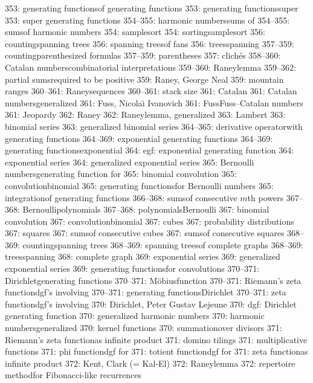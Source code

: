 353: generating functions\sub of generating functions
353: generating functions\sub super
353: super generating functions
354--355: harmonic numbers\sub sums of
354--355: sums\sub of harmonic numbers
354: samplesort
354: sorting\sub samplesort
356: counting\sub spanning trees
356: spanning trees\sub of fans
356: trees\sub spanning
357--359: counting\sub parenthesized formulas
357--359: parentheses
357: clich\'es
358--360: Catalan numbers\sub combinatorial interpretations
359--360: Raney\sub lemma
359--362: partial sums\sub required to be positive
359: Raney, George Neal
359: mountain ranges
360--361: Raney\sub sequences
360--361: stack size
361: Catalan
361: Catalan numbers\sub generalized
361: Fuss, Nicola{\u\i} Ivanovich
361: Fuss\sub Fuss--Catalan numbers
361: Jeopardy
362: Raney
362: Raney\sub lemma, generalized
363: Lambert
363: binomial series
363: generalized binomial series
364--365: derivative operator\sub with generating functions
364--369: exponential generating functions
364--369: generating functions\sub exponential
364: egf: exponential generating function
364: exponential series
364: generalized exponential series
365: Bernoulli numbers\sub generating function for
365: binomial convolution
365: convolution\sub binomial
365: generating functions\sub for Bernoulli numbers
365: integration\sub of generating functions
366--368: sums\sub of consecutive $m$th powers
367--368: Bernoulli\sub polynomials
367--368: polynomials\sub Bernoulli
367: binomial convolution
367: convolution\sub binomial
367: cubes
367: probability distributions
367: squares
367: sums\sub of consecutive cubes
367: sums\sub of consecutive squares
368--369: counting\sub spanning trees
368--369: spanning trees\sub of complete graphs
368--369: trees\sub spanning
368: complete graph
369: exponential series
369: generalized exponential series
369: generating functions\sub for convolutions
370--371: Dirichlet\sub generating functions
370--371: M\"obius\sub function
370--371: Riemann's zeta function\sub dgf's involving
370--371: generating functions\sub Dirichlet
370--371: zeta function\sub dgf's involving
370: Dirichlet, Peter Gustav Lejeune
370: dgf: Dirichlet generating function
370: generalized harmonic numbers
370: harmonic numbers\sub generalized
370: kernel functions
370: summation\sub over divisors
371: Riemann's zeta function\sub as infinite product
371: domino tilings
371: multiplicative functions
371: phi function\sub dgf for
371: totient function\sub dgf for
371: zeta function\sub as infinite product
372: Kent, Clark (= Kal-El)
372: Raney\sub lemma
372: repertoire method\sub for Fibonacci-like recurrences
